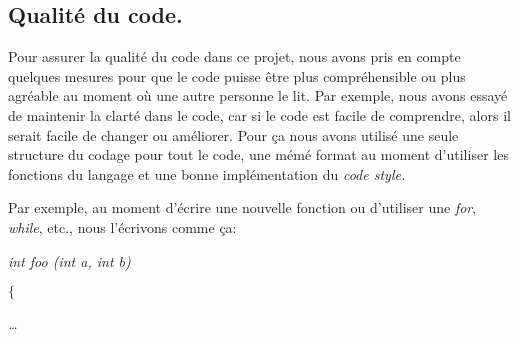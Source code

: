 \documentclass[a4paper,12pt]{article}
\begin{document}
\vspace{\baselineskip}
\noindent \subsection{Qualité du code.}\par


\vspace{\baselineskip}
\begin{justify}
Pour assurer la qualité du code dans ce projet, nous avons pris en compte quelques mesures pour que le code puisse être plus compréhensible ou plus agréable au moment où une autre personne le lit. Par exemple, nous avons essayé de maintenir la clarté dans le code, car si le code est facile de comprendre, alors il serait facile de changer ou améliorer. Pour ça nous avons utilisé une seule structure du codage pour tout le code, une mémé format au moment d’utiliser les fonctions du langage et une bonne implémentation du \textit{code style.}
\end{justify}\par

\begin{justify}
Par exemple, au moment d’écrire une nouvelle fonction ou d’utiliser une \textit{for}, \textit{while}, etc., nous l’écrivons comme ça:
\end{justify}\par

\begin{justify}
\hspace*{0.49in}\hspace*{0.49in}\hspace*{0.49in}\hspace*{0.49in}\hspace*{0.49in}\textit{int foo (int a, int b)}
\end{justify}\par

\begin{justify}
\hspace*{0.49in}\hspace*{0.49in}\hspace*{0.49in}\hspace*{0.49in}\textit{\hspace*{0.49in}$ \{ $ }
\end{justify}\par

\begin{justify}
\hspace*{0.49in}\hspace*{0.49in}\hspace*{0.49in}\hspace*{0.49in}\hspace*{0.49in}\textit{\hspace*{0.49in}…}
\end{justify}\par
\end{document}
